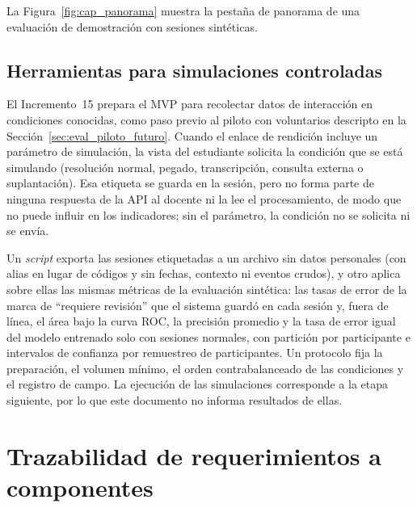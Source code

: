La Figura~\ref{fig:cap_panorama} muestra la pestaña de panorama de una evaluación de demostración con sesiones sintéticas.


\subsection{Herramientas para simulaciones controladas}
\label{sec:impl_simulacion}

El Incremento~15 prepara el MVP para recolectar datos de interacción en condiciones conocidas, como paso previo al piloto con voluntarios descripto en la Sección~\ref{sec:eval_piloto_futuro}. Cuando el enlace de rendición incluye un parámetro de simulación, la vista del estudiante solicita la condición que se está simulando (resolución normal, pegado, transcripción, consulta externa o suplantación). Esa etiqueta se guarda en la sesión, pero no forma parte de ninguna respuesta de la API al docente ni la lee el procesamiento, de modo que no puede influir en los indicadores; sin el parámetro, la condición no se solicita ni se envía.

Un \textit{script} exporta las sesiones etiquetadas a un archivo sin datos personales (con alias en lugar de códigos y sin fechas, contexto ni eventos crudos), y otro aplica sobre ellas las mismas métricas de la evaluación sintética: las tasas de error de la marca de ``requiere revisión'' que el sistema guardó en cada sesión y, fuera de línea, el área bajo la curva ROC, la precisión promedio y la tasa de error igual del modelo entrenado solo con sesiones normales, con partición por participante e intervalos de confianza por remuestreo de participantes. Un protocolo fija la preparación, el volumen mínimo, el orden contrabalanceado de las condiciones y el registro de campo. La ejecución de las simulaciones corresponde a la etapa siguiente, por lo que este documento no informa resultados de ellas.

\section{Trazabilidad de requerimientos a componentes}
\label{sec:impl_trazabilidad}

